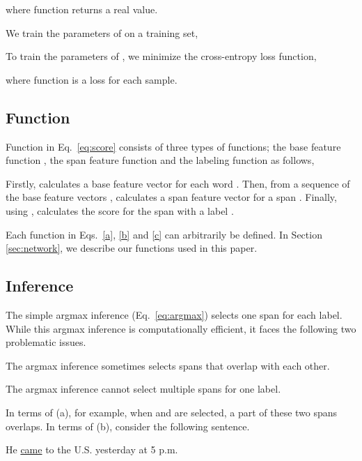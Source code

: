 \documentclass[11pt,a4paper]{article}
\begin{document}
\noindent
where function  returns a real value.

We train the parameters  of  on a training set,


\noindent
To train the parameters  of , we minimize the cross-entropy loss function,



\noindent
where function  is a loss for each sample.

\subsection{Function }
\label{sec:function}
Function  in Eq.~\ref{eq:score} consists of three types of functions; the base feature function , the span feature function  and the labeling function  as follows,


\noindent
Firstly,  calculates a base feature vector  for each word .
Then, from a sequence of the base feature vectors ,  calculates a span feature vector  for a span .
Finally, using ,  calculates the score for the span  with a label .

Each function in Eqs.~\ref{a}, \ref{b} and \ref{c} can arbitrarily be defined.
In Section \ref{sec:network}, we describe our functions used in this paper.

\subsection{Inference}
\label{sec:inference}

The simple argmax inference (Eq.~\ref{eq:argmax}) selects one span for each label.
While this argmax inference is computationally efficient, it faces the following two problematic issues.
\begin{description}
\setlength{\parskip}{0cm} 
\setlength{\itemsep}{0cm} 
\item[(a)] The argmax inference sometimes selects spans that overlap with each other.
\item[(b)] The argmax inference cannot select multiple spans for one label.
\end{description}

\noindent
In terms of (a), for example, when  and  are selected, a part of these two spans overlaps.
In terms of (b), consider the following sentence.\\\vspace{-0.2cm}

\hspace{0.1cm} He \underline{came} to the U.S. yesterday at 5 p.m.
\end{document}
